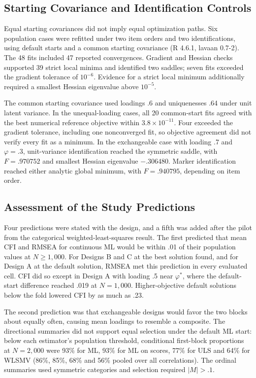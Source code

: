 \subsection{Starting Covariance and Identification Controls}
\label{supp:controls}

Equal starting covariances did not imply equal optimization paths. Six population cases were refitted under two item orders and two identifications, using default starts and a common starting covariance (R 4.6.1, lavaan 0.7-2). The 48 fits included 47 reported convergences. Gradient and Hessian checks supported 39 strict local minima and identified two saddles; seven fits exceeded the gradient tolerance of $10^{-6}$. Evidence for a strict local minimum additionally required a smallest Hessian eigenvalue above $10^{-5}$.

The common starting covariance used loadings .6 and uniquenesses .64 under unit latent variance. In the unequal-loading cases, all 20 common-start fits agreed with the best numerical reference objective within $3.8\times10^{-11}$. Four exceeded the gradient tolerance, including one nonconverged fit, so objective agreement did not verify every fit as a minimum. In the exchangeable case with loading .7 and $\varphi=.3$, unit-variance identification reached the symmetric saddle, with $F=.970752$ and smallest Hessian eigenvalue $-.306480$. Marker identification reached either analytic global minimum, with $F=.940795$, depending on item order.

\subsection{Assessment of the Study Predictions}

Four predictions were stated with the design, and a fifth was added after the pilot from the categorical weighted-least-squares result. The first predicted that mean CFI and RMSEA for continuous ML would be within .01 of their population values at $N\ge1{,}000$. For Designs B and C at the best solution found, and for Design A at the default solution, RMSEA met this prediction in every evaluated cell. CFI did so except in Design A with loading .5 near $\varphi^*$, where the default-start difference reached .019 at $N=1{,}000$. Higher-objective default solutions below the fold lowered CFI by as much as .23.

The second prediction was that exchangeable designs would favor the two blocks about equally often, causing mean loadings to resemble a composite. The directional summaries did not support equal selection under the default ML start: below each estimator's population threshold, conditional first-block proportions at $N=2{,}000$ were 93\% for ML, 93\% for ML on scores, 77\% for ULS and 64\% for WLSMV (86\%, 85\%, 68\% and 56\% pooled over all correlations). The ordinal summaries used symmetric categories and selection required $|M|>.1$.

